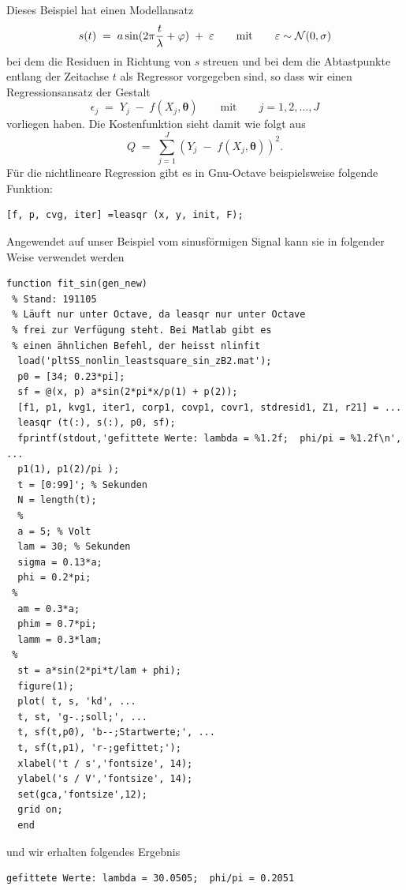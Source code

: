 Dieses Beispiel hat einen Modellansatz
\begin{equation}
s(t) \; = \; a \sin(2\pi \frac{t}{\lambda} + \varphi) \; + \; \varepsilon \qquad 
\textrm{mit} \qquad \varepsilon \sim {\cal N}(0,\sigma) 
\end{equation}
bei dem die Residuen in Richtung von $s$ streuen und bei dem die Abtastpunkte
entlang der Zeitachse $t$ als Regressor vorgegeben sind, so dass
wir einen Regressionsansatz der Gestalt
\begin{equation}
\epsilon_j \; = \; Y_j \; - \; f(X_j, \boldsymbol{\theta}) \qquad \textrm{mit} \qquad 
j=1, 2,\dots, J 
\end{equation}
vorliegen haben. Die Kostenfunktion sieht damit wie folgt aus
\begin{equation}
Q \; = \; \sum\limits_{j=1}^J \left(Y_j \; - \; f(X_j, \boldsymbol{\theta})\right)^2.
\end{equation}
Für die nichtlineare Regression gibt es in Gnu-Octave  beispielsweise folgende
Funktion:
\begin{verbatim}
[f, p, cvg, iter] =leasqr (x, y, init, F);
\end{verbatim}
Angewendet auf unser Beispiel vom sinusförmigen Signal kann sie in folgender Weise
verwendet werden
\begin{verbatim}
function fit_sin(gen_new)
 % Stand: 191105
 % Läuft nur unter Octave, da leasqr nur unter Octave
 % frei zur Verfügung steht. Bei Matlab gibt es
 % einen ähnlichen Befehl, der heisst nlinfit
  load('pltSS_nonlin_leastsquare_sin_zB2.mat');
  p0 = [34; 0.23*pi];
  sf = @(x, p) a*sin(2*pi*x/p(1) + p(2));
  [f1, p1, kvg1, iter1, corp1, covp1, covr1, stdresid1, Z1, r21] = ...
  leasqr (t(:), s(:), p0, sf);
  fprintf(stdout,'gefittete Werte: lambda = %1.2f;  phi/pi = %1.2f\n', ...
  p1(1), p1(2)/pi );
  t = [0:99]'; % Sekunden
  N = length(t);
  %
  a = 5; % Volt
  lam = 30; % Sekunden
  sigma = 0.13*a;
  phi = 0.2*pi;
 %
  am = 0.3*a;
  phim = 0.7*pi;
  lamm = 0.3*lam;
 %
  st = a*sin(2*pi*t/lam + phi);
  figure(1);
  plot( t, s, 'kd', ...
  t, st, 'g-.;soll;', ...
  t, sf(t,p0), 'b--;Startwerte;', ...
  t, sf(t,p1), 'r-;gefittet;');
  xlabel('t / s','fontsize', 14);
  ylabel('s / V','fontsize', 14);
  set(gca,'fontsize',12);
  grid on;
  end
\end{verbatim}
und wir erhalten folgendes Ergebnis
\begin{verbatim}
gefittete Werte: lambda = 30.0505;  phi/pi = 0.2051
\end{verbatim}

\newpage
